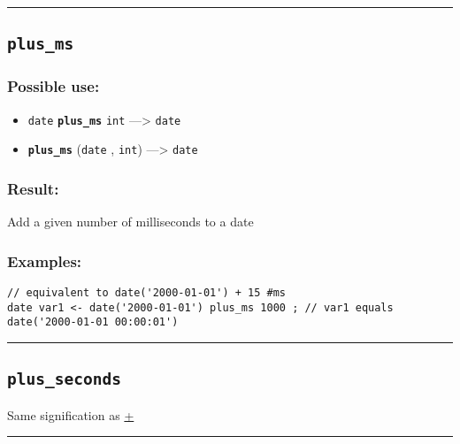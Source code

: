 \documentclass[]{book}
\providecommand{\tightlist}{%
  \setlength{\itemsep}{0pt}\setlength{\parskip}{0pt}}
\theoremstyle{definition}
\theoremstyle{definition}
\theoremstyle{definition}
\theoremstyle{remark}
\begin{document}
\begin{center}\rule{0.5\linewidth}{\linethickness}\end{center}

\subsection{\texorpdfstring{\texttt{plus\_ms}}{plus\_ms}}\label{plus_ms}

\subsubsection{Possible use:}\label{possible-use-405}

\begin{itemize}
\tightlist
\item
  \texttt{date} \textbf{\texttt{plus\_ms}} \texttt{int}
  ---\textgreater{} \texttt{date}
\item
  \textbf{\texttt{plus\_ms}} (\texttt{date} , \texttt{int})
  ---\textgreater{} \texttt{date}
\end{itemize}

\subsubsection{Result:}\label{result-391}

Add a given number of milliseconds to a date

\subsubsection{Examples:}\label{examples-280}

\begin{verbatim}
// equivalent to date('2000-01-01') + 15 #ms  
date var1 <- date('2000-01-01') plus_ms 1000 ; // var1 equals date('2000-01-01 00:00:01')
\end{verbatim}

\begin{center}\rule{0.5\linewidth}{\linethickness}\end{center}

\subsection{\texorpdfstring{\texttt{plus\_seconds}}{plus\_seconds}}\label{plus_seconds}

Same signification as \href{operators-a-to-a.html\#+}{+}

\begin{center}\rule{0.5\linewidth}{\linethickness}\end{center}
\end{document}
